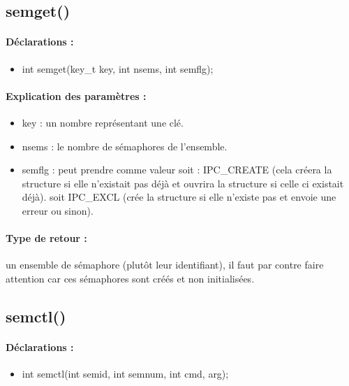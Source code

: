 \documentclass{article}[12pt]
\begin{document}
\subsection{semget()}
\paragraph{Déclarations : }
\begin{itemize}
	\item int semget(key\_t key, int nsems, int semflg);
\end{itemize}
\paragraph{Explication des paramètres : }
\begin{itemize}
\item key : un nombre représentant une clé.
\item nsems : le nombre de sémaphores de l'ensemble. 
\item semflg :  peut prendre comme valeur soit : IPC\_CREATE (cela créera la structure si elle n'existait pas déjà et ouvrira la structure si celle ci existait déjà). soit IPC\_EXCL (crée la structure si elle n'existe pas et envoie une erreur ou sinon).   
\end{itemize}
\paragraph{Type de retour : } un ensemble de sémaphore (plutôt leur identifiant), il faut par contre faire attention car ces sémaphores sont créés et non initialisées.
\subsection{semctl()}
\paragraph{Déclarations : }
\begin{itemize}
	\item int semctl(int semid, int semnum, int cmd, arg); 
\end{itemize}
\end{document}

